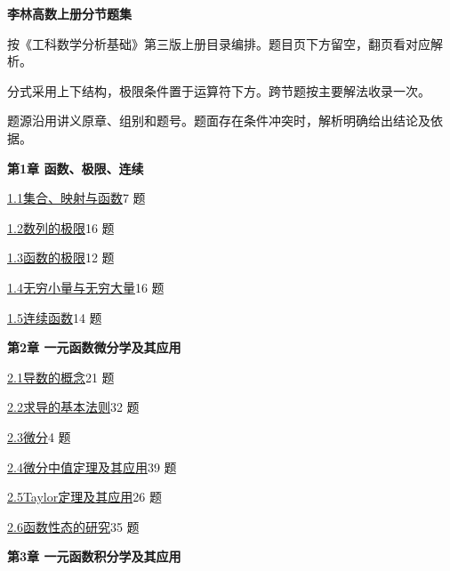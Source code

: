 \documentclass[UTF8,zihao=-4,fontset=fandol]{ctexart}
\begin{document}

{\LARGE\bfseries 李林高数上册分节题集}\par

{\small 按《工科数学分析基础》第三版上册目录编排。题目页下方留空，翻页看对应解析。}

\par{\small 分式采用上下结构，极限条件置于运算符下方。跨节题按主要解法收录一次。}

\par{\small 题源沿用讲义原章、组别和题号。题面存在条件冲突时，解析明确给出结论及依据。}

\par\smallskip\begingroup\setlength{\parskip}{0.5bp}\fontsize{10.8}{12}\selectfont

\par\smallskip\textbf{第1章 函数、极限、连续}

\par\hyperlink{s1.1}{1.1\quad 集合、映射与函数}\hfill 7 题

\par\hyperlink{s1.2}{1.2\quad 数列的极限}\hfill 16 题

\par\hyperlink{s1.3}{1.3\quad 函数的极限}\hfill 12 题

\par\hyperlink{s1.4}{1.4\quad 无穷小量与无穷大量}\hfill 16 题

\par\hyperlink{s1.5}{1.5\quad 连续函数}\hfill 14 题

\par\smallskip\textbf{第2章 一元函数微分学及其应用}

\par\hyperlink{s2.1}{2.1\quad 导数的概念}\hfill 21 题

\par\hyperlink{s2.2}{2.2\quad 求导的基本法则}\hfill 32 题

\par\hyperlink{s2.3}{2.3\quad 微分}\hfill 4 题

\par\hyperlink{s2.4}{2.4\quad 微分中值定理及其应用}\hfill 39 题

\par\hyperlink{s2.5}{2.5\quad Taylor定理及其应用}\hfill 26 题

\par\hyperlink{s2.6}{2.6\quad 函数性态的研究}\hfill 35 题

\par\smallskip\textbf{第3章 一元函数积分学及其应用}
\end{document}
